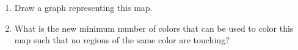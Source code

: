 \documentclass[12pt]{article}
\begin{document}
\begin{enumerate}
 
  \begin{enumerate}

  \item Draw a graph representing this map.


  \item What is the new minimum number of colors that can be used to
   color this map such that no regions of the same color are touching?


  \end{enumerate}

\end{enumerate}
\end{document}

